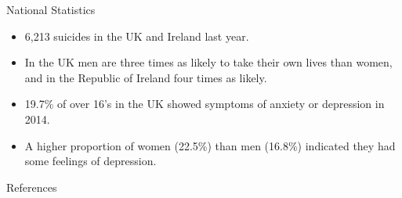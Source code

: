 \documentclass{beamer}
\begin{document}
\begin{frame}{National Statistics}
		\begin{itemize}
		\item 6,213 suicides in the UK and Ireland last year\cite{death2018suicide}.
		\item In the UK men are three times as likely to take their own lives than women, and in the Republic of Ireland four times as likely\cite{death2018suicide}.
		\item 19.7\% of over 16's in the UK showed symptoms of anxiety or depression in 2014\cite{MentalStatistics}.
		\item A higher proportion of women (22.5\%) than men (16.8\%) indicated they had some feelings of depression\cite{MentalStatistics}.
	\end{itemize}
\end{frame}
\begin{frame}{References}
	
	
\end{frame}
\end{document}
